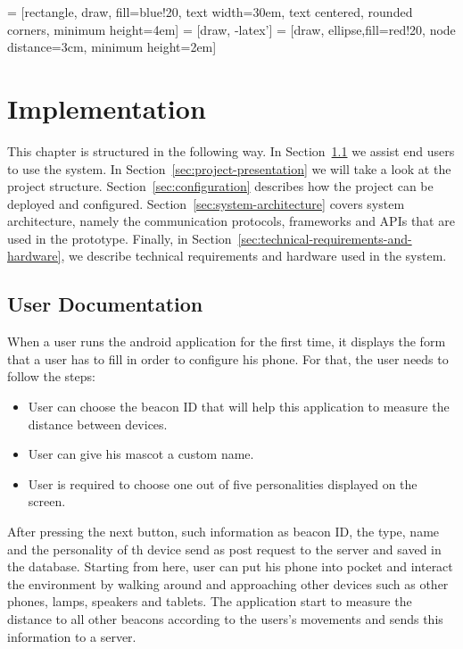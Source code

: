  = [rectangle, draw, fill=blue!20,
text width=30em, text centered, rounded corners, minimum height=4em]
 = [draw, -latex']
 = [draw, ellipse,fill=red!20, node distance=3cm,
minimum height=2em]

\chapter{Implementation}
\label{ch:implementation}
This chapter is structured in the following way.
In Section~\ref{sec:user-documentation} we assist end users to use the system.
In Section~\ref{sec:project-presentation} we will take a look at the project structure.
Section~\ref{sec:configuration} describes how the project can be deployed and configured.
Section~\ref{sec:system-architecture} covers system architecture, namely the
communication protocols, frameworks and APIs that are used in the prototype.
Finally, in Section~\ref{sec:technical-requirements-and-hardware}, we describe technical
requirements and hardware used in the system.

\section{User Documentation}
\label{sec:user-documentation}
When a user runs the android application for the first time, it displays the form that a
user has to fill in order to configure his phone.
For that, the user needs to follow the steps:

\begin{itemize}
    \item User can choose the beacon ID that will help this application to measure the distance between devices.
    \item User can give his mascot a custom name.
    \item User is required to choose one out of five personalities displayed on the screen.
\end{itemize}

After pressing the next button, such information as beacon ID,
the type, name and the personality of th device send as post request to the server and saved in the database.
Starting from here, user can put his phone into pocket and interact the environment by walking
around and approaching other devices such as other phones, lamps, speakers and tablets.
The application start to measure the distance to all other beacons according to the users's
movements and sends this information to a server.

